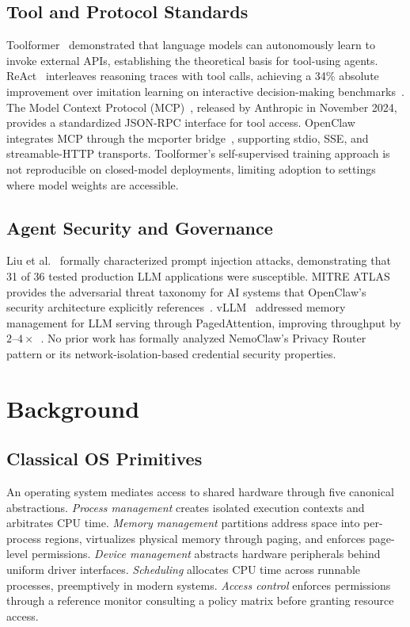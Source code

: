 \documentclass[journal]{IEEEtran}
\begin{document}
\subsection{Tool and Protocol Standards}

Toolformer~\cite{schick2023toolformer} demonstrated that language models can
autonomously learn to invoke external APIs, establishing the theoretical basis
for tool-using agents. ReAct~\cite{yao2023react} interleaves reasoning traces
with tool calls, achieving a 34\% absolute improvement over imitation learning
on interactive decision-making benchmarks~\cite{yao2023react}. The Model
Context Protocol (MCP)~\cite{anthropic2024mcp}, released by Anthropic in
November 2024, provides a standardized JSON-RPC interface for tool access.
OpenClaw integrates MCP through the mcporter bridge~\cite{openclaw2024docs},
supporting stdio, SSE, and streamable-HTTP transports.
Toolformer's self-supervised training approach is not reproducible on closed-model deployments, limiting adoption to settings where model weights are accessible.

\subsection{Agent Security and Governance}

Liu et al.~\cite{liu2023promptinjection} formally characterized prompt
injection attacks, demonstrating that 31 of 36 tested production LLM
applications were susceptible. MITRE ATLAS~\cite{mitre2024atlas} provides the
adversarial threat taxonomy for AI systems that OpenClaw's security
architecture explicitly references~\cite{openclaw2024docs}. vLLM~\cite{kwon2023vllm}
addressed memory management for LLM serving through PagedAttention, improving
throughput by $2$--$4\times$~\cite{kwon2023vllm}. No prior work has formally
analyzed NemoClaw's Privacy Router pattern or its network-isolation-based
credential security properties.

\section{Background}

\subsection{Classical OS Primitives}

An operating system mediates access to shared hardware through five canonical
abstractions. \textit{Process management} creates isolated execution contexts
and arbitrates CPU time. \textit{Memory management} partitions address space
into per-process regions, virtualizes physical memory through paging, and
enforces page-level permissions. \textit{Device management} abstracts hardware
peripherals behind uniform driver interfaces. \textit{Scheduling} allocates
CPU time across runnable processes, preemptively in modern systems.
\textit{Access control} enforces permissions through a reference monitor
consulting a policy matrix before granting resource access.
\end{document}
